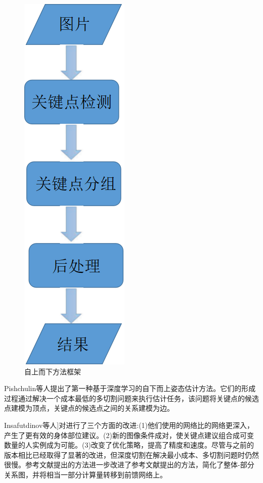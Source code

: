 \documentclass[hyperref]{ctexart}
\begin{document}
\begin{multicols}{2}
		\begin{figure}[H]
			\centering
			\includegraphics[scale = 0.7]{9}
			\caption{自上而下方法框架}
			\label{h}
		\end{figure}
		
		Pishchulin等人\cite{pishchulin2016deepcut}提出了第一种基于深度学习的自下而上姿态估计方法。它们的形成过程通过解决一个成本最低的多切割问题来执行估计任务，该问题将关键点的候选点建模为顶点，关键点的候选点之间的关系建模为边。
		
		Insafutdinov等人\cite{DBLP:conf/eccv/InsafutdinovPAA16}]对\cite{pishchulin2016deepcut}进行了三个方面的改进:(1)他们使用的网络比\cite{pishchulin2016deepcut}的网络更深入，产生了更有效的身体部位建议。(2)新的图像条件成对，使关键点建议组合成可变数量的人实例成为可能。(3)改变了优化策略，提高了精度和速度。尽管与之前的版本\cite{pishchulin2016deepcut}相比已经取得了显著的改进，但深度切割\cite{DBLP:conf/eccv/InsafutdinovPAA16}在解决最小成本、多切割问题时仍然很慢。参考文献\cite{8099625}提出的方法进一步改进了参考文献\cite{DBLP:conf/eccv/InsafutdinovPAA16}提出的方法，简化了整体-部分关系图，并将相当一部分计算量转移到前馈网络上。
		

\end{multicols}
\end{document}
